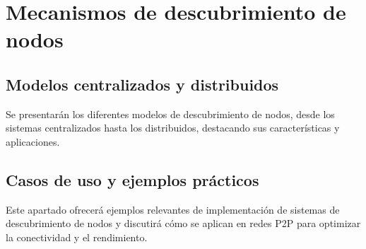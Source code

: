 \section{Mecanismos de descubrimiento de nodos}
\subsection{Modelos centralizados y distribuidos}
Se presentarán los diferentes modelos de descubrimiento de nodos, desde los sistemas centralizados hasta los distribuidos, destacando sus características y aplicaciones.

\subsection{Casos de uso y ejemplos prácticos}
Este apartado ofrecerá ejemplos relevantes de implementación de sistemas de descubrimiento de nodos y discutirá cómo se aplican en redes P2P para optimizar la conectividad y el rendimiento.
